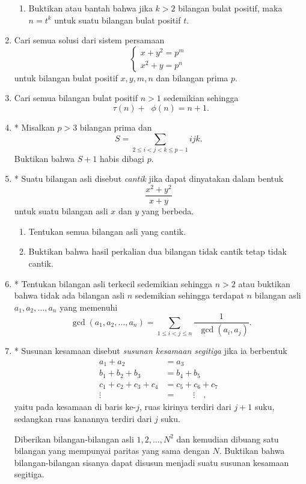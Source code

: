 \documentclass[12pt]{article}
\newcommand*\func[2]{\mathop{}\!{#1}{\left({#2}\right)}}
\begin{document}
\begin{enumerate}[leftmargin=*]
\begin{enumerate}
			\item Buktikan atau bantah bahwa jika $ k > 2 $ bilangan bulat positif, maka $ n = t^{k} $ untuk suatu bilangan bulat positif $ t $.
		\end{enumerate}
		\item Cari semua solusi dari sistem persamaan
		\[
			\begin{cases}
				x + y^{2} = p^{m} \\
				x^{2} + y = p^{n}
			\end{cases}
		\]
		untuk bilangan bulat positif $ x, y, m, n $ dan bilangan prima $ p $.
		\item Cari semua bilangan bulat positif $ n > 1 $ sedemikian sehingga
		\[ \func{\tau}{n} + \func{\phi}{n} = n + 1. \]
		\item* Misalkan $ p > 3 $ bilangan prima dan
		\[ S = \sum_{2 \leq i < j < k \leq p - 1}{ijk}. \]
		Buktikan bahwa $ S + 1 $ habis dibagi $ p $.
		\item* Suatu bilangan asli disebut \textit{cantik} jika dapat dinyatakan dalam bentuk
		\[ \frac{x^{2} + y^{2}}{x + y} \]
		untuk suatu bilangan asli $ x $ dan $ y $ yang berbeda.
		\begin{enumerate}
			\item Tentukan semua bilangan asli yang cantik.
			\item Buktikan bahwa hasil perkalian dua bilangan tidak cantik tetap tidak cantik.
		\end{enumerate}
		\item* Tentukan bilangan asli terkecil sedemikian sehingga $ n > 2 $ atau buktikan bahwa tidak ada bilangan asli $ n $ sedemikian sehingga terdapat $ n $ bilangan asli $ a_{1}, a_{2}, \dots, a_{n} $ yang memenuhi
		\[ \func{\gcd}{a_{1}, a_{2}, \dots, a_{n}} = \sum_{1 \leq i < j \leq n}{\frac{1}{\func{\gcd}{a_{i}, a_{j}}}}. \]
		\item* Susunan kesamaan disebut \textit{susunan kesamaan segitiga} jika ia berbentuk
		\begin{align*}
			a_{1} + a_{2} &= a_{3} \\
			b_{1} + b_{2} + b_{3} &= b_{4} + b_{5} \\
			c_{1} + c_{2} + c_{3} + c_{4} &= c_{5} + c_{6} + c_{7} \\
			\vdots \qquad &= \qquad \vdots \quad ,
		\end{align*}
		yaitu pada kesamaan di baris ke-$ j $, ruas kirinya terdiri dari $ j + 1 $ suku, sedangkan ruas kanannya terdiri dari $ j $ suku.
		\par \noindent Diberikan bilangan-bilangan asli $ 1, 2, \dots, N^{2} $ dan kemudian dibuang satu bilangan yang mempunyai paritas yang sama dengan $ N $. Buktikan bahwa bilangan-bilangan sisanya dapat disusun menjadi suatu susunan kesamaan segitiga.

\end{enumerate}
\end{document}
